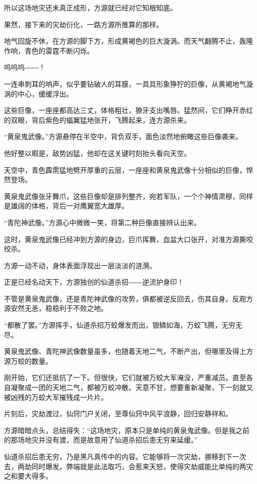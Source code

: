\begin{this_body}
所以这场地灾还未真正成形，方源就已经对它知根知底。

果然，接下来的灾劫衍化，一路方源所推算的那样。

地气回旋不休，在方源的脚下方，形成黄褐色的巨大漩涡。而天气翻腾不止，轰隆作响，青色的雷霆不断闪烁。

呜呜呜――！

一连串刺耳的响声，似乎要钻破人的耳膜，一具具形象狰狞的巨像，从黄褐地气漩涡的中心，缓缓浮出。

这些巨像，一座座都高达三丈，体格粗壮，獠牙支出嘴唇。猛然间，它们睁开赤红的双眼，背后紫色的蝠翼猛地张开，飞腾起来，连方源杀来。

“黄泉鬼武像。”方源悬停在半空中，背负双手，面色淡然地俯瞰这些巨像袭来。

他好整以暇是，敌势凶猛，他却在这关键时刻抬头看向天空。

天空中，青色霹雳猛地劈开厚重的云层，一座座和黄泉鬼武像十分相似的巨像，悍然登场。

黄泉鬼武像张牙舞爪，这些巨像却是排列整齐，宛若军队，一个个神情肃穆，同样是雄阔的体格，背后一对鹰翼宽大雄厚。

“青陀神武像。”方源心中微微一笑，将第二种巨像直接辨认出来。

这时，黄泉鬼武像已经冲到方源的身边，巨爪挥舞，血盆大口张开，对准方源撕咬绞杀。

方源一动不动，身体表面浮现出一层淡淡的涟漪。

正是已经名动天下，方源独创的仙道杀招――逆流护身印！

不管是黄泉鬼武像，还是青陀神武像的攻势，俱都被逆反回去，伤其自身。反观方源安然无恙，稳稳利于不败之地。

“都散了罢。”方源挥手，仙道杀招万蛟爆发而出，银鳞如海，万蛟飞腾，无穷无尽。

黄泉鬼武像、青陀神武像数量虽多，也随着天地二气，不断产出，但哪里及得上方源万蛟的数量。

刚开始，它们还抵抗了一下。但很快，它们就被万蛟大军淹没，严重减员。直至各自凝聚成一团的天地二气，都被万蛟冲散。天意不甘，想要重新凝聚，下一刻就又被凶残的万蛟大军摧残成一片片。

片刻后，灾劫渡过，仙窍门户关闭，至尊仙窍中风平浪静，回归安静祥和。

方源暗暗点头，总结得失：“这场地灾，原本只是单纯的黄泉鬼武像。但是我之前的那场地灾并没有渡，而是故意用了仙道杀招后患无穷来延缓。”

仙道杀招后患无穷，乃是黑凡真传中的内容。它能够将一次灾劫，挪移到下一次去，两劫同时爆发。弊端就是此法取巧，会惹来天怒，使得灾劫威能比单纯的两灾之和要大得多。


\end{this_body}
